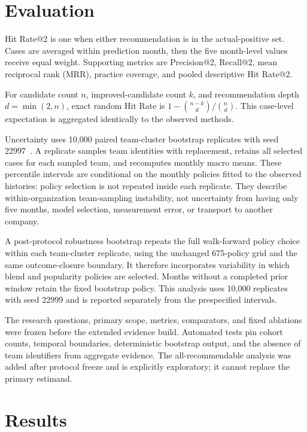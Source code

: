 \documentclass[runningheads]{llncs}
\begin{document}
\section{Evaluation}

Hit Rate@2 is one when either recommendation is in the actual-positive set. Cases are averaged within prediction month, then the five month-level values receive equal weight. Supporting metrics are Precision@2, Recall@2, mean reciprocal rank (MRR), practice coverage, and pooled descriptive Hit Rate@2.

For candidate count $n$, improved-candidate count $k$, and recommendation depth $d=\min(2,n)$, exact random Hit Rate is $1-\binom{n-k}{d}/\binom{n}{d}$. This case-level expectation is aggregated identically to the observed methods.

Uncertainty uses 10,000 paired team-cluster bootstrap replicates with seed 22997~\cite{efron1979bootstrap,deen2020clusterbootstrap}. A replicate samples team identities with replacement, retains all selected cases for each sampled team, and recomputes monthly macro means. These percentile intervals are conditional on the monthly policies fitted to the observed histories: policy selection is not repeated inside each replicate. They describe within-organization team-sampling instability, not uncertainty from having only five months, model selection, measurement error, or transport to another company.

A post-protocol robustness bootstrap repeats the full walk-forward policy choice within each team-cluster replicate, using the unchanged 675-policy grid and the same outcome-closure boundary. It therefore incorporates variability in which blend and popularity policies are selected. Months without a completed prior window retain the fixed bootstrap policy. This analysis uses 10,000 replicates with seed 22999 and is reported separately from the prespecified intervals.

The research questions, primary scope, metrics, comparators, and fixed ablations were frozen before the extended evidence build. Automated tests pin cohort counts, temporal boundaries, deterministic bootstrap output, and the absence of team identifiers from aggregate evidence. The all-recommendable analysis was added after protocol freeze and is explicitly exploratory; it cannot replace the primary estimand.

\section{Results}
\end{document}
